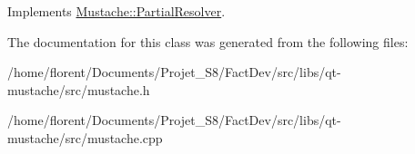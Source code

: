 Implements \hyperlink{classMustache_1_1PartialResolver_a81e9c5a8b32a52266cd8ea0580c3d3ac}{Mustache\-::\-Partial\-Resolver}.



The documentation for this class was generated from the following files\-:\begin{DoxyCompactItemize}
\item 
/home/florent/\-Documents/\-Projet\-\_\-\-S8/\-Fact\-Dev/src/libs/qt-\/mustache/src/mustache.\-h\item 
/home/florent/\-Documents/\-Projet\-\_\-\-S8/\-Fact\-Dev/src/libs/qt-\/mustache/src/mustache.\-cpp\end{DoxyCompactItemize}
